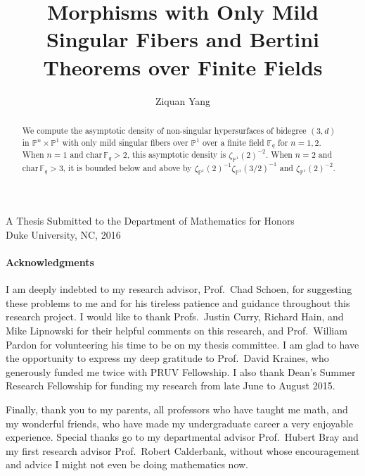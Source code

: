 \documentclass[12pt]{article}
\theoremstyle{plain}
\theoremstyle{definition}
\newcommand{\IF}{\mathbb{F}}
\newcommand{\IP}{\mathbb{P}}
\newcommand{\<}{\langle}
\renewcommand{\>}{\rangle}
\begin{document}
%
\title{Morphisms with Only Mild Singular Fibers and Bertini Theorems over 
Finite Fields}
\author{Ziquan Yang}
\date{}
\maketitle 

\begin{center}
A Thesis Submitted to the Department of Mathematics for Honors \\
Duke University, NC, 2016
\end{center}
\newpage

\begin{abstract}
We compute the asymptotic density of non-singular hypersurfaces of bidegree $(3, d)$ in $\IP^n \times \IP^1$ with only mild singular fibers over $\IP^1$ over a finite field $\IF_q$ for $n = 1, 2$. When $n = 1$ and $\mathrm{char\,} \IF_q > 2$, this asymptotic density is $\zeta_{\IP^1}(2)^{-2}$. When $n = 2$ and $\mathrm{char\,} \IF_q > 3$, it is bounded below and above by $\zeta_{\IP^1}(2)^{-1} \zeta_{\IP^1}(3/2)^{-1}$ and $\zeta_{\IP^1}(2)^{-2}$. 
\end{abstract}

\newpage

\paragraph{Acknowledgments}

I am deeply indebted to my research advisor, Prof.~Chad Schoen, for suggesting these problems to me and for his tireless patience and guidance throughout this research project. I would like to thank Profs.~Justin Curry, Richard Hain, and Mike Lipnowski for their helpful comments on this research, and Prof.~William Pardon for volunteering his time to be on my thesis committee. I am glad to have the opportunity to express my deep gratitude to Prof.~David Kraines, who generously funded me twice with PRUV Fellowship. I also thank Dean's Summer Research Fellowship for funding my research from late June to August 2015. 

Finally, thank you to my parents, all professors who have taught me math, and my wonderful friends, who have made my undergraduate career a very enjoyable experience. Special thanks go to my departmental advisor Prof.~Hubert Bray and my first research advisor Prof.~Robert Calderbank, without whose encouragement and advice I might not even be doing mathematics now. 


\newpage
\tableofcontents
\end{document}

